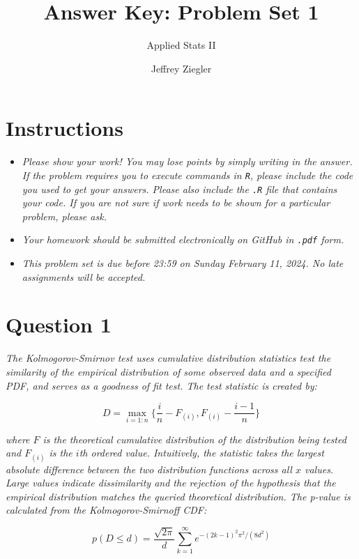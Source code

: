 \documentclass[12pt,letterpaper]{article}
\title{Answer Key: Problem Set 1}
\date{Jeffrey Ziegler}
\author{Applied Stats II}
\begin{document}
	\maketitle
	
	\section*{Instructions}
	\begin{itemize}
		\item \textit{Please show your work! You may lose points by simply writing in the answer. If the problem requires you to execute commands in \texttt{R}, please include the code you used to get your answers. Please also include the \texttt{.R} file that contains your code. If you are not sure if work needs to be shown for a particular problem, please ask.}
			\item \textit{Your homework should be submitted electronically on GitHub in \texttt{.pdf} form.}
			\item \textit{This problem set is due before 23:59 on Sunday February 11, 2024. No late assignments will be accepted.}

	\end{itemize}
	\vspace{.25cm}
	
	\section*{Question 1}
	\vspace{.25cm}
	\noindent \emph{The Kolmogorov-Smirnov test uses cumulative distribution statistics test the similarity of the empirical distribution of some observed data and a specified PDF, and serves as a goodness of fit test. The test statistic is created by:}
	
	$$D = \max_{i=1:n} \Big\{ \frac{i}{n}  - F_{(i)}, F_{(i)} - \frac{i-1}{n} \Big\}$$
	
	\noindent \emph{where $F$ is the theoretical cumulative distribution of the distribution being tested and $F_{(i)}$ is the $i$th ordered value. Intuitively, the statistic takes the largest absolute difference between the two distribution functions across all $x$ values. Large values indicate dissimilarity and the rejection of the hypothesis that the empirical distribution matches the queried theoretical distribution. The p-value is calculated from the Kolmogorov-Smirnoff CDF:}
	
$$p(D \leq d)= \frac{\sqrt {2\pi}}{d} \sum _{k=1}^{\infty }e^{-(2k-1)^{2}\pi ^{2}/(8d^{2})}$$
	
\end{document}
